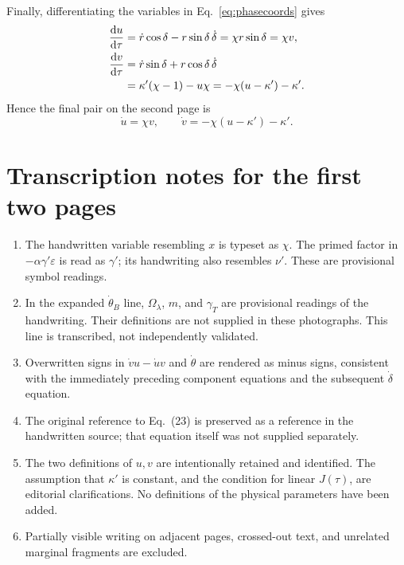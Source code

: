 \documentclass[11pt,a4paper]{article}
\newcommand{\dd}{\mathrm{d}}
\begin{document}
Finally, differentiating the variables in Eq.~\eqref{eq:phasecoords} gives
\begin{align}
\frac{\dd u}{\dd\tau}
&=\dot r\cos\delta-r\sin\delta\,\dot\delta
=\chi r\sin\delta=\chi v,\\
\frac{\dd v}{\dd\tau}
&=\dot r\sin\delta+r\cos\delta\,\dot\delta\notag\\
&=\kappa'(\chi-1)-u\chi
=-\chi(u-\kappa')-\kappa'.
\end{align}
Hence the final pair on the second page is
\begin{equation}
\boxed{\dot u=\chi v,\qquad \dot v=-\chi(u-\kappa')-\kappa'.}
\end{equation}

\section*{Transcription notes for the first two pages}
\begin{enumerate}
\item The handwritten variable resembling $x$ is typeset as $\chi$.
The primed factor in $-\alpha\gamma'\varepsilon$ is read as $\gamma'$;
its handwriting also resembles $\nu'$. These are provisional symbol readings.
\item In the expanded $\dot\theta_B$ line, $\Omega_\lambda$, $m$, and
$\gamma_T$ are provisional readings of the handwriting. Their definitions
are not supplied in these photographs. This line is transcribed, not
independently validated.
\item Overwritten signs in $\dot v u-\dot u v$ and $\dot\theta$
are rendered as minus signs, consistent with the immediately preceding
component equations and the subsequent $\dot\delta$ equation.
\item The original reference to Eq.~(23) is preserved as a reference in the
handwritten source; that equation itself was not supplied separately.
\item The two definitions of $u,v$ are intentionally retained and identified.
The assumption that $\kappa'$ is constant, and the condition for linear $J(\tau)$,
are editorial clarifications. No definitions of the physical parameters
have been added.
\item Partially visible writing on adjacent pages, crossed-out text, and
unrelated marginal fragments are excluded.
\end{enumerate}
\newpage
\end{document}
